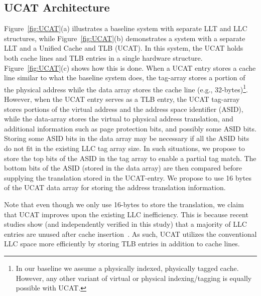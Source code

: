 
\subsection{UCAT Architecture}

\noindent Figure~\ref{fig:UCAT}(a) illustrates a baseline system with
separate LLT and LLC structures, while Figure~\ref{fig:UCAT}(b)
demonstrates a system with a separate LLT and a Unified Cache and TLB
(UCAT). In this system, the UCAT holds both cache lines and TLB
entries in a single hardware structure. Figure~\ref{fig:UCAT}(c) shows
how this is done. When a UCAT entry stores a cache line similar to
what the baseline system does, the tag-array stores a portion of the
physical address while the data array stores the cache line (e.g.,
32-bytes)\footnote{In our baseline we assume a physically indexed,
physically tagged cache. However, any other variant of virtual or
physical indexing/tagging is equally possible with UCAT.}. However,
when the UCAT entry serves as a TLB entry, the UCAT tag-array stores
portions of the virtual address and the address space identifier
(ASID), while the data-array stores the virtual to physical address
translation, and additional information such as page protection bits,
and possibly some ASID bits. Storing some ASID bits in the data array
may be necessary if all the ASID bits do not fit in the existing LLC
tag array size. In such situations, we propose to store the top bits
of the ASID in the tag array to enable a partial tag match. The bottom
bits of the ASID (stored in the data array) are then compared before
supplying the translation stored in the UCAT-entry. We propose to use
16 bytes of the UCAT data array for storing the address translation
information.

Note that even though we only use 16-bytes to store the translation,
we claim that UCAT improves upon the existing LLC inefficiency. This
is because recent studies show (and independently verified in this
study) that a majority of LLC entries are unused after cache
insertion~\cite{jaleel_rrip,setdueling,wu2011,jimenez_micro2013,khan2010}.
As such, UCAT utilizes the conventional LLC space more efficiently by
storing TLB entries in addition to cache lines.

